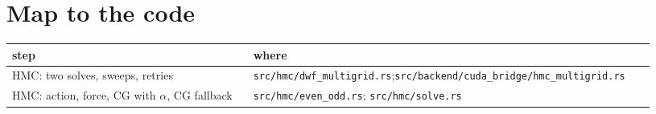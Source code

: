 \documentclass[11pt,a4paper]{article}
\numberwithin{equation}{section}
\newcommand{\code}[1]{\texttt{\small #1}}
\begin{document}
\section{Map to the code}
\begin{center}
\small
\begin{tabular}{@{}p{0.36\linewidth}p{0.6\linewidth}@{}}
\toprule
step & where\\
\midrule
HMC: two solves, sweeps, retries & \code{src/hmc/dwf\_multigrid.rs};\newline \code{src/backend/cuda\_bridge/hmc\_multigrid.rs}\\
HMC: action, force, CG with $\alpha$, CG fallback & \code{src/hmc/even\_odd.rs}; \code{src/hmc/solve.rs}\\
\bottomrule
\end{tabular}
\end{center}
\end{document}

